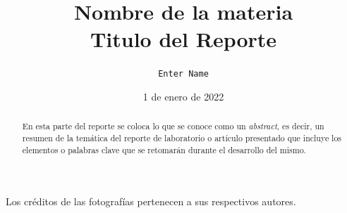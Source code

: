 \documentclass[letterpaper,12pt]{article} %
\newcommand{\myMateria}{Nombre de la materia}
\newcommand{\MyReport}{Titulo del Reporte}
\newcommand{\myDate}{1 de enero de 2022}
\newcommand{\myName}{Enter Name}
\begin{document}
    
    \newpage
    \tableofcontents
    \newpage

\title{\myMateria \\\textbf{\MyReport} \\ } 

\author{ \normalsize{\texttt{\myName}} }
\date{\myDate}
\maketitle
\thispagestyle{fancy}

\begin{abstract}
En esta parte del reporte se coloca lo que se conoce como un \textit{abstract}, es decir, un resumen de la temática del reporte de laboratorio o artículo presentado que incluye los elementos o palabras clave que se retomarán durante el desarrollo del mismo.
\end{abstract}




\nocite{*}




\centering \small Los créditos de las fotografías pertenecen a sus respectivos autores.

\centering\vspace*{\fill} 
\end{document}
